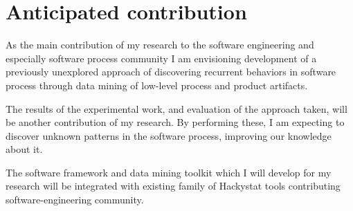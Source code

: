 \chapter{Anticipated contribution} \label{contribution}
As the main contribution of my research to the software engineering and especially software process community I am envisioning development of a previously unexplored approach of discovering recurrent behaviors in software process through data mining of low-level process and product artifacts.

The results of the experimental work, and evaluation of the approach taken, will be another contribution of my research. By performing these, I am expecting to discover unknown patterns in the software process, improving our knowledge about it.

The software framework and data mining toolkit which I will develop for my research will be integrated with existing family of Hackystat tools contributing software-engineering community.
